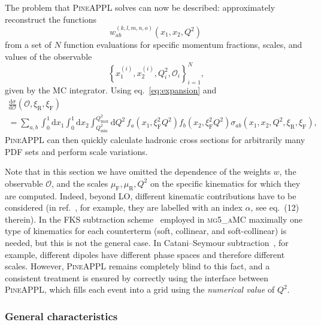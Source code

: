 The problem that \textsc{PineAPPL} solves can now be described: approximately reconstruct the functions
\begin{equation}
w_{ab}^{(k,l,m,n,o)} \left( x_1, x_2, Q^2 \right)
\label{eq:weight-map}
\end{equation}
from a set of $N$ function evaluations for specific momentum fractions, scales, and values of the observable
\begin{equation}
\left\{ x_1^{(i)}, x_2^{(i)}, Q^2_i, \mathcal{O}_i \right\}_{i=1}^N \text{,} \label{eq:phase-space-weights}
\end{equation}
given by the MC integrator.
Using eq.~\eqref{eq:expansion} and
\begin{multline}
\frac{\mathrm{d} \sigma}{\mathrm{d} \mathcal{O}} (\mathcal{O}, \xi_\mathrm{R}, \xi_\mathrm{F}) \\
= \sum_{a,b} \int_0^1 \mathrm{d} x_1 \int_0^1 \mathrm{d} x_2 \int_{Q^2_\mathrm{min}}^{Q^2_\mathrm{max}} \mathrm{d} Q^2 \, f_a (x_1, \xi_\mathrm{F}^2 Q^2) f_b (x_2, \xi_\mathrm{F}^2 Q^2) \sigma_{ab} (x_1, x_2, Q^2, \xi_\mathrm{R}, \xi_\mathrm{F}) \text{,}
\label{eq:pineappl-convolution}
\end{multline}
\textsc{PineAPPL} can then quickly calculate hadronic cross sections for arbitrarily many PDF sets and perform scale variations.

Note that in this section we have omitted the dependence of the weights $w$, the observable $\mathcal{O}$, and the scales $\mu_\mathrm{F}, \mu_\mathrm{R}, Q^2$ on the specific kinematics for which they are computed.
Indeed, beyond LO, different kinematic contributions have to be considered (in ref.~\cite{Bertone:2014zva}, for example, they are labelled with an index $\alpha$, see eq.~(12) therein).
In the FKS subtraction scheme~\cite{Frixione:1995ms,Frixione:1997np} employed in \textsc{mg5\_aMC} maximally one type of kinematics for each counterterm (soft, collinear, and soft-collinear) is needed, but this is not the general case.
In Catani--Seymour subtraction~\cite{Catani:1996jh}, for example, different dipoles have different phase spaces and therefore different scales.
However, \textsc{PineAPPL} remains completely blind to this fact, and a consistent treatment is ensured by correctly using the interface between \textsc{PineAPPL}, which fills each event into a grid using the \emph{numerical value} of $Q^2$.

\subsubsection{General characteristics}

